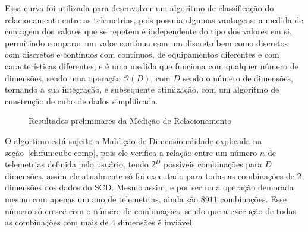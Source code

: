Essa curva foi utilizada para desenvolver um algoritmo de classificação do relacionamento entre as telemetrias, pois possuia algumas vantagens: a medida de contagem dos valores que se repetem é independente do tipo dos valores em si, permitindo comparar um valor contínuo com um discreto bem como discretos com discretos e contínuos com contínuos, de equipamentos diferentes e com características diferentes; e é uma medida que funciona com qualquer número de dimensões, sendo uma operação $\mathcal{O}(D)$, com $D$ sendo o número de dimensões, tornando a sua integração, e subsequente otimização, com um algoritmo de construção de cubo de dados simplificada.

\begin{figure}[ht]
	\caption{Resultados preliminares da Medição de Relacionamento}
	\vspace{6mm}
	\begin{center}
	\end{center}
	\vspace{4mm}
	\label{fig:similarityresults}
\end{figure}

O algortimo está sujeito a Maldição de Dimensionalidade explicada na seção~\ref{ch:fun:cube:comp}, pois ele verifica a relação entre um número $n$ de telemetrias definida pelo usuário, tendo $2^D$ possíveis combinações para $D$ dimensões, assim ele atualmente só foi executado para todas as combinações de 2 dimensões dos dados do SCD.
Mesmo assim, e por ser uma operação demorada mesmo com apenas um ano de telemetrias, ainda são $8911$ combinações.
Esse número só cresce com o número de combinações, sendo que a execução de todas as combinações com mais de 4 dimensões é inviável.

